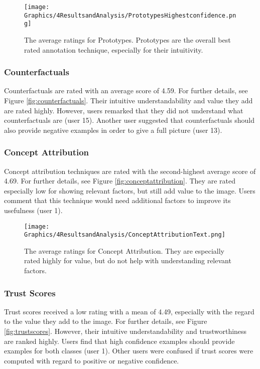 \begin{figure*}
    \centering
    \texttt{[image: Graphics/4ResultsandAnalysis/PrototypesHighestconfidence.png]}
    \caption{The average ratings for Prototypes. Prototypes are the overall best rated annotation technique, especially for their intuitivity.}
    \label{fig:prototypes}
\end{figure*}

\subsubsection{Counterfactuals}

Counterfactuals are rated with an average score of 4.59. For further details, see Figure \ref{fig:counterfactuals}. Their intuitive understandability and value they add are rated highly. However, users remarked that they did not understand what counterfactuals are (user 15). Another user suggested that counterfactuals should also provide negative examples in order to give a full picture (user 13).

\subsubsection{Concept Attribution}

Concept attribution techniques are rated with the second-highest average score of 4.69. For further details, see Figure \ref{fig:conceptattribution}. They are rated especially low for showing relevant factors, but still add value to the image. Users comment that this technique would need additional factors to improve its usefulness (user 1).

\begin{figure*}
    \centering
    \texttt{[image: Graphics/4ResultsandAnalysis/ConceptAttributionText.png]}
    \caption{The average ratings for Concept Attribution. They are especially rated highly for value, but do not help with understanding relevant factors.}
    \label{fig:conceptattribution_text}
\end{figure*}

\subsubsection{Trust Scores}

Trust scores received a low rating with a mean of 4.49, especially with the regard to the value they add to the image. For further details, see Figure \ref{fig:trustscores}. However, their intuitive understandability and trustworthiness are ranked highly. Users find that high confidence examples should provide examples for both classes (user 1). Other users were confused if trust scores were computed with regard to positive or negative confidence.

